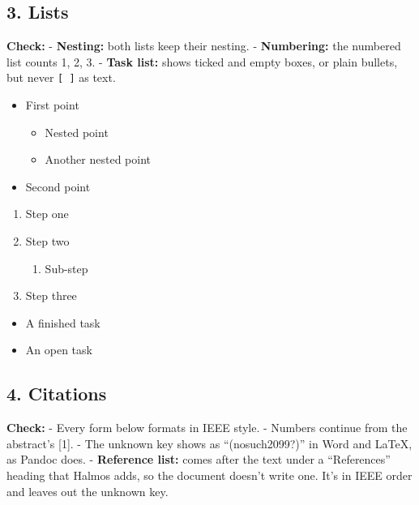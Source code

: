 \documentclass[
]{article}
\providecommand{\tightlist}{%
  \setlength{\itemsep}{0pt}\setlength{\parskip}{0pt}}
\begin{document}
\subsection{3. Lists}\label{lists}

\textbf{Check:} - \textbf{Nesting:} both lists keep their nesting. -
\textbf{Numbering:} the numbered list counts 1, 2, 3. - \textbf{Task
list:} shows ticked and empty boxes, or plain bullets, but never
\texttt{{[}\ {]}} as text.

\begin{itemize}
\tightlist
\item
  First point

  \begin{itemize}
  \tightlist
  \item
    Nested point
  \item
    Another nested point
  \end{itemize}
\item
  Second point
\end{itemize}

\begin{enumerate}
\def\labelenumi{\arabic{enumi}.}
\tightlist
\item
  Step one
\item
  Step two

  \begin{enumerate}
  \def\labelenumii{\arabic{enumii}.}
  \tightlist
  \item
    Sub-step
  \end{enumerate}
\item
  Step three
\end{enumerate}

\begin{itemize}
\tightlist
\item[$\boxtimes$]
  A finished task
\item[$\square$]
  An open task
\end{itemize}

\subsection{4. Citations}\label{citations}

\textbf{Check:} - Every form below formats in IEEE style. - Numbers
continue from the abstract's {[}1{]}. - The unknown key shows as
``(nosuch2099?)'' in Word and LaTeX, as Pandoc does. - \textbf{Reference
list:} comes after the text under a ``References'' heading that Halmos
adds, so the document doesn't write one. It's in IEEE order and leaves
out the unknown key.
\end{document}
